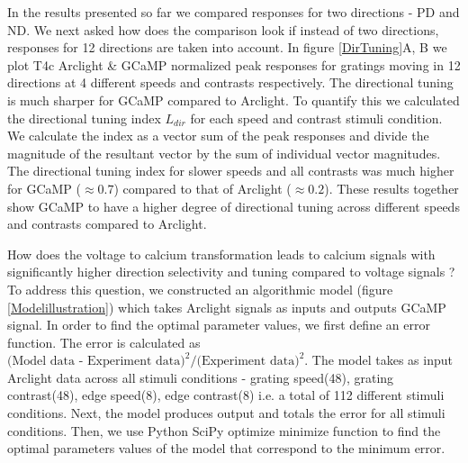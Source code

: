 \documentclass[9pt,lineno]{elife}
\begin{document}
In the results presented so far we compared responses for two directions - PD and ND. We next asked how does the comparison look if instead of two directions, responses for 12 directions are taken into account. In figure \ref{DirTuning}A, B we plot T4c Arclight \& GCaMP normalized peak responses for gratings moving in 12 directions at 4 different speeds and contrasts respectively. The directional tuning is much sharper for GCaMP compared to Arclight. To quantify this we calculated the directional tuning index $L_{dir}$ \parencite{Mazurek2014} for each speed and contrast stimuli condition. We calculate the index as a vector sum of the peak responses and divide the magnitude of the resultant vector by the sum of individual vector magnitudes. The directional tuning index for slower speeds and all contrasts was much higher for GCaMP ($\approx0.7$) compared to that of Arclight ($\approx0.2$). These results together show GCaMP to have a higher degree of directional tuning across different speeds and contrasts compared to Arclight.

How does the voltage to calcium transformation leads to calcium signals with significantly higher direction selectivity and tuning compared to voltage signals ? To address this question, we constructed an algorithmic model (figure \ref{Modelillustration}) which takes Arclight signals as inputs and outputs GCaMP signal. In order to find the optimal parameter values, we first define an error function. The error is calculated as $\text{(Model data - Experiment data)}^2 / \text{(Experiment data)}^2$. The model takes as input Arclight data across all stimuli conditions - grating speed(48), grating contrast(48), edge speed(8), edge contrast(8) i.e. a total of 112 different stimuli conditions. Next, the model produces output and totals the error for all stimuli conditions. Then, we use Python SciPy optimize minimize function to find the optimal parameters values of the model that correspond to the minimum error.
\end{document}
